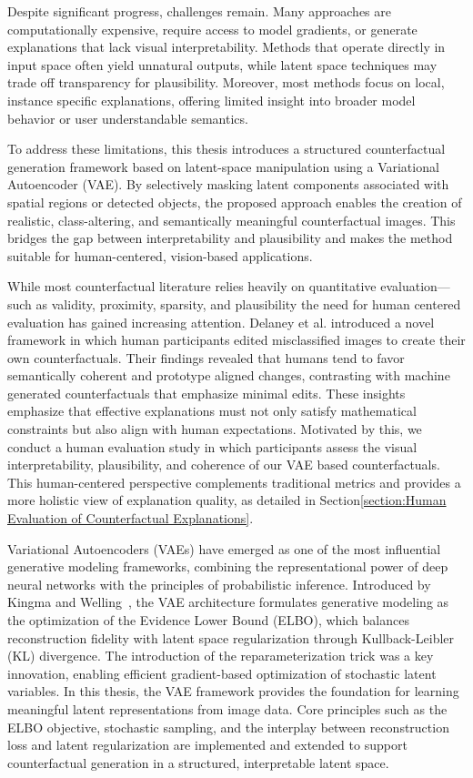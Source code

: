 Despite significant progress, challenges remain. Many approaches are computationally expensive, require access to model gradients, or generate explanations that lack visual interpretability. Methods that operate directly in input space often yield unnatural outputs, while latent space techniques may trade off transparency for plausibility.  Moreover, most methods focus on local, instance specific explanations, offering limited insight into broader model behavior or user understandable semantics.

To address these limitations, this thesis introduces a structured counterfactual generation framework based on latent-space manipulation using a Variational Autoencoder (VAE). By selectively masking latent components associated with spatial regions or detected objects, the proposed approach enables the creation of realistic, class-altering, and semantically meaningful counterfactual images. This bridges the gap between interpretability and plausibility and makes the method suitable for human-centered, vision-based applications.

While most counterfactual literature relies heavily on quantitative evaluation—such as validity, proximity, sparsity, and plausibility the need for human centered evaluation has gained increasing attention. Delaney et al.\cite{DELANEY2023103995} introduced a novel framework in which human participants edited misclassified images to create their own counterfactuals. Their findings revealed that humans tend to favor semantically coherent and prototype aligned changes, contrasting with machine generated counterfactuals that emphasize minimal edits. These insights emphasize that effective explanations must not only satisfy mathematical constraints but also align with human expectations. Motivated by this, we conduct a human evaluation study in which participants assess the visual interpretability, plausibility, and coherence of our VAE based counterfactuals. This human-centered perspective complements traditional metrics and provides a more holistic view of explanation quality, as detailed in Section\ref{section:Human Evaluation of Counterfactual Explanations}.


Variational Autoencoders (VAEs) have emerged as one of the most influential generative modeling frameworks, combining the representational power of deep neural networks with the principles of probabilistic inference. Introduced by Kingma and Welling~\cite{Kingma_2019}, the VAE architecture formulates generative modeling as the optimization of the Evidence Lower Bound (ELBO), which balances reconstruction fidelity with latent space regularization through Kullback-Leibler (KL) divergence. The introduction of the reparameterization trick was a key innovation, enabling efficient gradient-based optimization of stochastic latent variables. In this thesis, the VAE framework provides the foundation for learning meaningful latent representations from image data. Core principles such as the ELBO objective, stochastic sampling, and the interplay between reconstruction loss and latent regularization are implemented and extended to support counterfactual generation in a structured, interpretable latent space.

